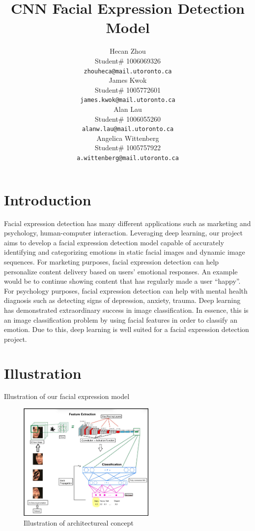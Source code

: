 \documentclass{article} %
\title{CNN Facial Expression Detection Model}
\author{Hecan Zhou  \\
Student\# 1006069326\\
\texttt{zhouheca@mail.utoronto.ca} \\
\And
James Kwok  \\
Student\# 1005772601 \\
\texttt{james.kwok@mail.utoronto.ca} \\
\AND
Alan Lau  \\
Student\# 1006055260 \\
\texttt{alanw.lau@mail.utoronto.ca} \\
\And
Angelica Wittenberg \\
Student\# 1005757922 \\
\texttt{a.wittenberg@mail.utoronto.ca} \\
\AND
}
\begin{document}
\maketitle

\section{Introduction }
Facial expression detection has many different applications such as marketing and psychology, human-computer interaction. Leveraging deep learning, our project aims to develop a facial expression detection model capable of accurately identifying and categorizing emotions in static facial images and dynamic image sequences. For marketing purposes, facial expression detection can help personalize content delivery based on users' emotional responses. An example would be to continue showing content that has regularly made a user “happy”. For psychology purposes, facial expression detection can help with mental health diagnosis such as detecting signs of depression, anxiety, trauma. Deep learning has demonstrated extraordinary success in image classification. In essence, this is an image classification problem by using facial features in order to classify an emotion. Due to this, deep learning is well suited for a facial expression detection project.

\section{Illustration }
Illustration of our facial expression model

\begin{figure}[h]
\begin{center}
\includegraphics[width=0.6\textwidth]{Figs/aps360.png}
\end{center}
\caption{Illustration of architectureal concept}
\end{figure}
\end{document}
